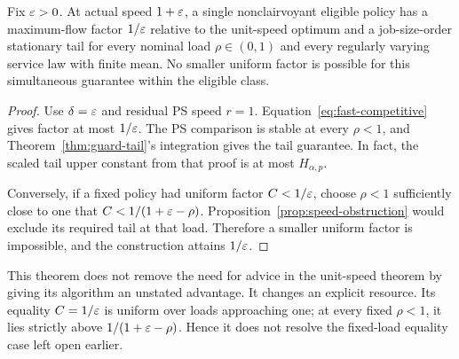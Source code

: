 \begin{theorem}\label{thm:zero-advice-speed}
Fix $\varepsilon>0$. At actual speed $1+\varepsilon$, a single nonclairvoyant eligible policy has a maximum-flow factor $1/\varepsilon$ relative to the unit-speed optimum and a job-size-order stationary tail for every nominal load $\rho\in(0,1)$ and every regularly varying service law with finite mean. No smaller uniform factor is possible for this simultaneous guarantee within the eligible class.
\end{theorem}
\begin{proof}
Use $\delta=\varepsilon$ and residual PS speed $r=1$. Equation~\eqref{eq:fast-competitive} gives factor at most $1/\varepsilon$. The PS comparison is stable at every $\rho<1$, and Theorem~\ref{thm:guard-tail}'s integration gives the tail guarantee. In fact, the scaled tail upper constant from that proof is at most $H_{\alpha,p}$.

Conversely, if a fixed policy had uniform factor $C<1/\varepsilon$, choose $\rho<1$ sufficiently close to one that $C<1/(1+\varepsilon-\rho)$. Proposition~\ref{prop:speed-obstruction} would exclude its required tail at that load. Therefore a smaller uniform factor is impossible, and the construction attains $1/\varepsilon$.
\end{proof}

This theorem does not remove the need for advice in the unit-speed theorem by giving its algorithm an unstated advantage. It changes an explicit resource. Its equality $C=1/\varepsilon$ is uniform over loads approaching one; at every fixed $\rho<1$, it lies strictly above $1/(1+\varepsilon-\rho)$. Hence it does not resolve the fixed-load equality case left open earlier.
